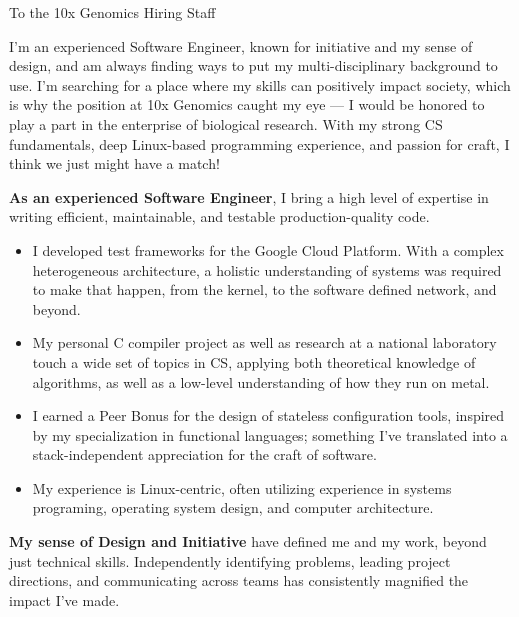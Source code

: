 \documentclass[sans, a4paper, 11pt]{article}
\newcommand{\cvcolor}[1]{{\color{MidnightBlue}#1}}
\renewcommand{\hl}[1]{\cvcolor{\textbf{#1}}}
\begin{document}
\begin{adjustwidth}{40pt}{40pt}

  To the 10x Genomics Hiring Staff \par \bigskip

  I'm an experienced Software Engineer, known for initiative and my sense of
  design, and am always finding ways to put my multi-disciplinary background to
  use. I'm searching for a place where my skills can positively impact society,
  which is why the position at 10x Genomics caught my eye --- I would be
  honored to play a part in the enterprise of biological research. With my
  strong CS fundamentals, deep Linux-based programming experience, and passion
  for craft, I think we just might have a match!\medskip

  \hl{As an experienced Software Engineer}, I bring a high level of expertise
  in writing efficient, maintainable, and testable production-quality code.
  \smallskip

  \begin{itemize}

    \item I developed test frameworks for the Google Cloud Platform. With a
      complex heterogeneous architecture, a holistic understanding of systems
      was required to make that happen, from the kernel, to the software
      defined network, and beyond.

    \item My personal C compiler project as well as research at a national
      laboratory touch a wide set of topics in CS, applying both theoretical
      knowledge of algorithms, as well as a low-level understanding of how they
      run on metal.

     \item I earned a Peer Bonus for the design of stateless configuration
       tools, inspired by my specialization in functional languages; something
       I've translated into a stack-independent appreciation for the craft of
       software.

    \item My experience is Linux-centric, often utilizing experience in systems
      programing, operating system design, and computer architecture.

  \end{itemize}\smallskip

  \hl{My sense of Design and Initiative} have defined me and my work, beyond
  just technical skills. Independently identifying problems, leading project
  directions, and communicating across teams has consistently magnified the
  impact I've made.\smallskip


\end{adjustwidth}
\end{document}
